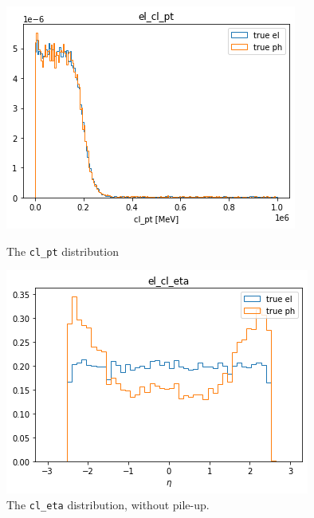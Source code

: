 \documentclass[a4paper, oneside, 11pt, openright]{book}
\begin{document}
				\begin{figure}[h!]
					\begin{minipage}[b]{0.5\linewidth}
						\centering
						\includegraphics[width=.9\linewidth]{tesi_images/el_cl_pt.png} 
						\caption{The \texttt{cl\_pt} distribution} 
						\label{fig: pt}
						\vspace{4ex}
					\end{minipage}%
					\begin{minipage}[b]{0.5\linewidth}
						\centering
						\includegraphics[width=.9\linewidth]{tesi_images/el_cl_eta.png} 
						\caption{The \texttt{cl\_eta} distribution, without pile-up.} 
						\label{fig: eta}
						\vspace{4ex}
					\end{minipage} 
				\end{figure}
			
\end{document}
